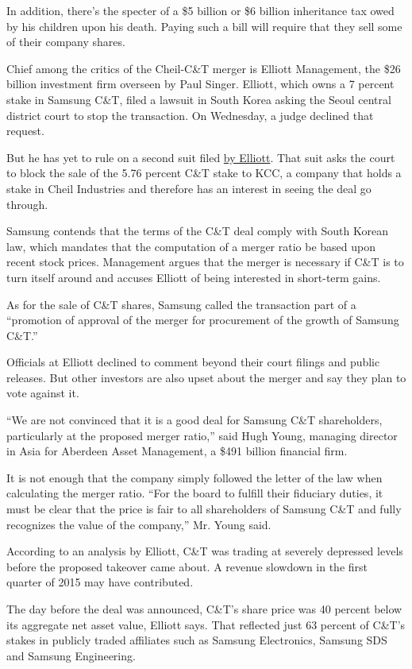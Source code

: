 In addition, there's the specter of a \$5 billion or \$6 billion
inheritance tax owed by his children upon his death. Paying such a bill
will require that they sell some of their company shares.

Chief among the critics of the Cheil-C\&T merger is Elliott Management,
the \$26 billion investment firm overseen by Paul Singer. Elliott, which
owns a 7 percent stake in Samsung C\&T, filed a lawsuit in South Korea
asking the Seoul central district court to stop the transaction. On
Wednesday, a judge declined that request.

But he has yet to rule on a second suit filed
\href{http://www.fairdealforsct.com/present/}{by Elliott}. That suit
asks the court to block the sale of the 5.76 percent C\&T stake to KCC,
a company that holds a stake in Cheil Industries and therefore has an
interest in seeing the deal go through.

Samsung contends that the terms of the C\&T deal comply with South
Korean law, which mandates that the computation of a merger ratio be
based upon recent stock prices. Management argues that the merger is
necessary if C\&T is to turn itself around and accuses Elliott of being
interested in short-term gains.

As for the sale of C\&T shares, Samsung called the transaction part of a
``promotion of approval of the merger for procurement of the growth of
Samsung C\&T.''

Officials at Elliott declined to comment beyond their court filings and
public releases. But other investors are also upset about the merger and
say they plan to vote against it.

``We are not convinced that it is a good deal for Samsung C\&T
shareholders, particularly at the proposed merger ratio,'' said Hugh
Young, managing director in Asia for Aberdeen Asset Management, a \$491
billion financial firm.

It is not enough that the company simply followed the letter of the law
when calculating the merger ratio. ``For the board to fulfill their
fiduciary duties, it must be clear that the price is fair to all
shareholders of Samsung C\&T and fully recognizes the value of the
company,'' Mr. Young said.

According to an analysis by Elliott, C\&T was trading at severely
depressed levels before the proposed takeover came about. A revenue
slowdown in the first quarter of 2015 may have contributed.

The day before the deal was announced, C\&T's share price was 40 percent
below its aggregate net asset value, Elliott says. That reflected just
63 percent of C\&T's stakes in publicly traded affiliates such as
Samsung Electronics, Samsung SDS and Samsung Engineering.

